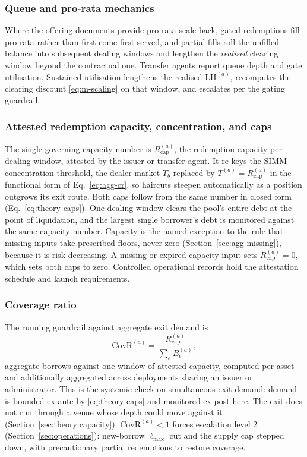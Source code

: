 \subsubsection{Queue and pro-rata mechanics}
Where the offering documents provide pro-rata scale-back, gated redemptions fill pro-rata rather than first-come-first-served, and partial fills roll the unfilled balance into subsequent dealing windows and lengthen the \emph{realised} clearing window beyond the contractual one. Transfer agents report queue depth and gate utilisation. Sustained utilisation lengthens the realised $\mathrm{LH}^{(a)}$, recomputes the clearing discount \eqref{eq:m-scaling} on that window, and escalates per the gating guardrail.

\subsubsection{Attested redemption capacity, concentration, and caps}
The single governing capacity number is $R^{(a)}_{\mathrm{cap}}$, the redemption capacity per dealing window, attested by the issuer or transfer agent. It re-keys the SIMM concentration threshold, the dealer-market $T_b$ replaced by $T^{(a)}=R^{(a)}_{\mathrm{cap}}$ in the functional form of Eq.~\eqref{eq:agg-cr}, so haircuts steepen automatically as a position outgrows its exit route. Both caps follow from the same number in closed form (Eq.~\eqref{eq:theory-caps}). One dealing window clears the pool's entire debt at the point of liquidation, and the largest single borrower's debt is monitored against the same capacity number. Capacity is the named exception to the rule that missing inputs take prescribed floors, never zero (Section~\ref{sec:agg-missing}), because it is risk-decreasing. A missing or expired capacity input sets $R_{\mathrm{cap}}^{(a)}=0$, which sets both caps to zero. Controlled operational records hold the attestation schedule and launch requirements.

\subsubsection{Coverage ratio}
The running guardrail against aggregate exit demand is
\begin{equation}\label{eq:covr}
\mathrm{CovR}^{(a)}=\frac{R^{(a)}_{\mathrm{cap}}}{\sum_{e}B^{(a)}_{e}},
\end{equation}
aggregate borrows against one window of attested capacity, computed per asset and additionally aggregated across deployments sharing an issuer or administrator. This is the systemic check on simultaneous exit demand: demand is bounded ex ante by \eqref{eq:theory-caps} and monitored ex post here. The exit does not run through a venue whose depth could move against it (Section~\ref{sec:theory:capacity}). $\mathrm{CovR}^{(a)}<1$ forces escalation level 2 (Section~\ref{sec:operations}): new-borrow $\ell_{\max}$ cut and the supply cap stepped down, with precautionary partial redemptions to restore coverage.

